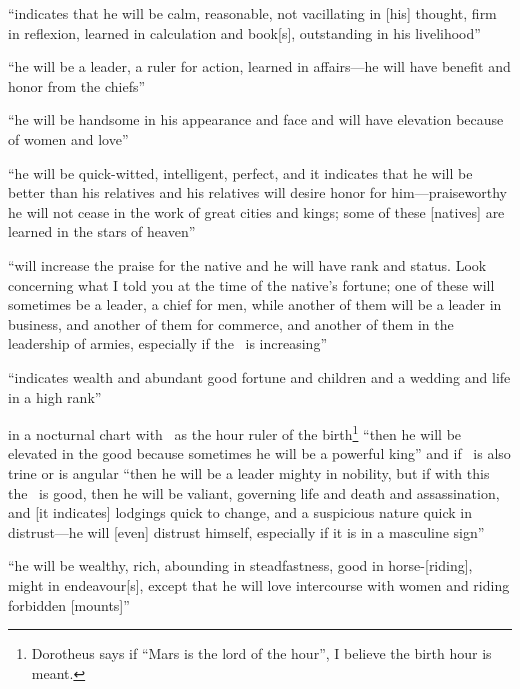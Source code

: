 \begin{description}[style=multiline,leftmargin=2.5cm]
\item[\Saturn\Trine\Mercury] ``indicates that he will be calm, reasonable, not vacillating in [his] thought, firm in reflexion, learned in calculation and book[s], outstanding in his livelihood''

\item[\Jupiter\Trine\Mars] ``he will be a leader, a ruler for action, learned in affairs---he will have benefit and honor from the chiefs''

\item[\Jupiter\Trine\Venus] ``he will be handsome in his appearance and face and will have elevation because of women and love''

\item[\Jupiter\Trine\Mercury] ``he will be quick-witted, intelligent, perfect, and it indicates that he will be better than his relatives and his relatives will desire honor for him---praiseworthy he will not cease in the work of great cities and kings; some of these [natives] are learned in the stars of heaven''

\item[\Jupiter\Trine\Moon] ``will increase the praise for the native and he will have rank and status. Look concerning what I told you at the time of the native's fortune; one of these will sometimes be a leader, a chief for men, while another of them will be a leader in business, and another of them for commerce, and another of them in the leadership of armies, especially if the \Moon\, is increasing''

\item[\Jupiter\Trine\Sun] ``indicates wealth and abundant good fortune and children and a wedding and life in a high rank''

\item[\Mars\Trine\Sun] in a nocturnal chart with \Mars\, as the hour ruler of the birth\footnote{Dorotheus says if ``Mars is the lord of the hour'', I believe the birth hour is meant.} ``then he will be elevated in the good because sometimes he will be a powerful king'' and if \Jupiter\, is also trine or is angular ``then he will be a leader mighty in nobility, but if with this the \Moon\, is good, then he will be valiant, governing life and death and assassination, and [it indicates] lodgings quick to change, and a suspicious nature quick in distrust---he will [even] distrust himself, especially if it is in  a masculine sign''

\item[\Mars\Trine\Venus] ``he will be wealthy, rich, abounding in steadfastness, good in horse-[riding], might in endeavour[s], except that he will love intercourse with women and riding forbidden [mounts]''


\end{description}
